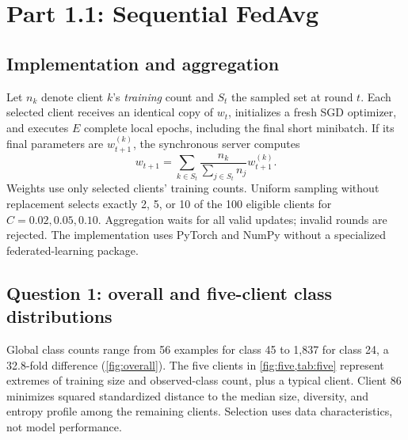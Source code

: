 \section{Part 1.1: Sequential FedAvg}\label{sec:p11}
\subsection{Implementation and aggregation}
Let $n_k$ denote client $k$'s \emph{training} count and $S_t$ the sampled set at round $t$. Each selected client receives an identical copy of $w_t$, initializes a fresh SGD optimizer, and executes $E$ complete local epochs, including the final short minibatch. If its final parameters are $w_{t+1}^{(k)}$, the synchronous server computes
\begin{equation}
 w_{t+1}=\sum_{k\in S_t}\frac{n_k}{\sum_{j\in S_t}n_j}w_{t+1}^{(k)}.\label{eq:fedavg}
\end{equation}
Weights use only selected clients' training counts. Uniform sampling without replacement selects exactly 2, 5, or 10 of the 100 eligible clients for $C=0.02,0.05,0.10$. Aggregation waits for all valid updates; invalid rounds are rejected. The implementation uses PyTorch and NumPy without a specialized federated-learning package.

\subsection{Question 1: overall and five-client class distributions}
Global class counts range from 56 examples for class 45 to 1,837 for class 24, a 32.8-fold difference (\cref{fig:overall}). The five clients in \cref{fig:five,tab:five} represent extremes of training size and observed-class count, plus a typical client. Client 86 minimizes squared standardized distance to the median size, diversity, and entropy profile among the remaining clients. Selection uses data characteristics, not model performance.

